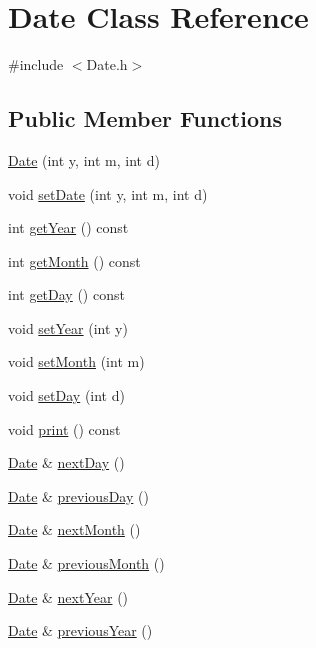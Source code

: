 \hypertarget{classDate}{}\section{Date Class Reference}
\label{classDate}


{\ttfamily \#include $<$Date.\+h$>$}

\subsection*{Public Member Functions}
\begin{DoxyCompactItemize}
\item 
\hyperlink{classDate_a147bd9e8e7a33cc62c60f2ce3d46fbf5}{Date} (int y, int m, int d)
\item 
void \hyperlink{classDate_a4ed169cf9b2c9670083ac2f1e87729ff}{set\+Date} (int y, int m, int d)
\item 
int \hyperlink{classDate_acbe0df036d53e8ddcfa96523177bbd23}{get\+Year} () const 
\item 
int \hyperlink{classDate_a378143c24ab06d9dd38712fc515056dc}{get\+Month} () const 
\item 
int \hyperlink{classDate_a9114656893af6950f86e9438c9d01c77}{get\+Day} () const 
\item 
void \hyperlink{classDate_ae50d821702b1998f10487e6eee3f4785}{set\+Year} (int y)
\item 
void \hyperlink{classDate_ab137497d665577fb8a5e964eafd7dbfd}{set\+Month} (int m)
\item 
void \hyperlink{classDate_a785b3d8fbce101d565528b9032cea462}{set\+Day} (int d)
\item 
void \hyperlink{classDate_a7c3881597e07d4e1ccb50037eca79ec5}{print} () const 
\item 
\hyperlink{classDate}{Date} \& \hyperlink{classDate_af260b6e2ba7e7aa2fcca0d6bbafb3573}{next\+Day} ()
\item 
\hyperlink{classDate}{Date} \& \hyperlink{classDate_aa6ce7ce31fa0a127343f0626aefa40e0}{previous\+Day} ()
\item 
\hyperlink{classDate}{Date} \& \hyperlink{classDate_a708a38641ee9c2365a53090364f92fc0}{next\+Month} ()
\item 
\hyperlink{classDate}{Date} \& \hyperlink{classDate_a95307f1900d32b98caedb959988361f2}{previous\+Month} ()
\item 
\hyperlink{classDate}{Date} \& \hyperlink{classDate_a4835307418add39a9cbc4f2c6654246d}{next\+Year} ()
\item 
\hyperlink{classDate}{Date} \& \hyperlink{classDate_aa6fa73ef9aa2e87c72c567b26af9889b}{previous\+Year} ()
\end{DoxyCompactItemize}
